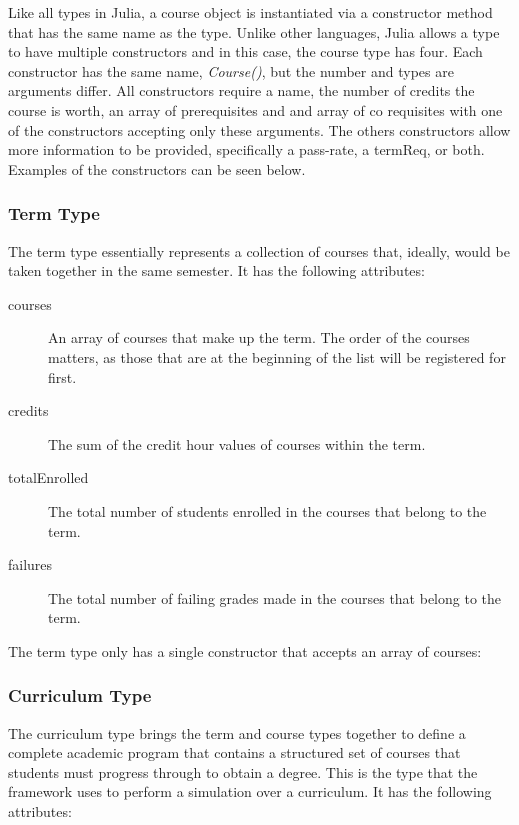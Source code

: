 \documentclass[botnum, fleqn]{unmeethesis}
\begin{document}
      Like all types in Julia, a course object is instantiated via a constructor method that has the same name as the type. Unlike other languages, Julia allows a type to have multiple constructors and in this case, the course type has four. Each constructor has the same name, \textit{Course()}, but the number and types are arguments differ. All constructors require a name, the number of credits the course is worth, an array of prerequisites and and array of co requisites with one of the constructors accepting only these arguments. The others constructors allow more information to be provided, specifically a pass-rate, a termReq, or both. Examples of the constructors can be seen below.

      

    \subsubsection{Term Type}
      The term type essentially represents a collection of courses that, ideally, would be taken together in the same semester. It has the following attributes:

      \begin{description}
        \item [courses] An array of courses that make up the term. The order of the courses matters, as those that are at the beginning of the list will be registered for first.
        \item [credits] The sum of the credit hour values of courses within the term.
        \item [totalEnrolled] The total number of students enrolled in the courses that belong to the term.
        \item [failures] The total number of failing grades made in the courses that belong to the term.
      \end{description}

      The term type only has a single constructor that accepts an array of courses:

      

    \subsubsection{Curriculum Type}
      The curriculum type brings the term and course types together to define a complete academic program that contains a structured set of courses that students must progress through to obtain a degree. This is the type that the framework uses to perform a simulation over a curriculum. It has the following attributes:
\end{document}
